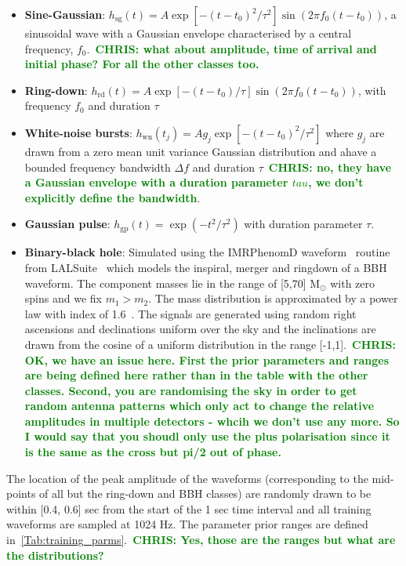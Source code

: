 \documentclass[12pt]{iopart}
\newcommand{\chris}[1]{\textbf{\textcolor{green}{CHRIS: #1}}}
\begin{document}
%
\begin{itemize}
%
\item {\bf Sine-Gaussian}: $h_{\text{sg}}(t) = A \exp\left[ - (t-t_{0})^2 /
\tau^2 \right] \sin (2 \pi f_0 (t-t_0))$, a sinusoidal wave with a Gaussian
envelope characterised by a central frequency, $f_0$.~\chris{what about
amplitude, time of arrival and initial phase? For all the other classes too.}
%
\item {\bf Ring-down}: $h_{\text{rd}}(t) = A \exp \left[-{(t-t_0)} / {\tau}
\right] \sin(2 \pi f_0 (t-t_0))$, with frequency $f_0$ and duration $\tau$
%
\item {\bf White-noise bursts}: $h_{\text{wn}}(t_j) = Ag_j\exp\left[ -
(t-t_{0})^2 / \tau^2 \right]$ where $g_j$ are drawn from a zero mean unit
variance Gaussian distribution and ahave a bounded frequency bandwidth $\Delta
f$ and duration $\tau$~\chris{no, they have a Gaussian envelope with a duration
parameter $tau$, we don't explicitly define the bandwidth}.
%
\item {\bf Gaussian pulse}: $h_{\text{gp}}(t) = \exp(-t^2 / \tau^2)$ with
duration parameter $\tau$.
%
\item {\bf Binary-black hole}: Simulated using the IMRPhenomD
waveform~\cite{Khan_2016} routine from LALSuite~\cite{lalsuite} which models
the inspiral, merger and ringdown of a \ac{BBH} waveform. The component masses
lie in the range of [5,70] $\textrm{M}_{\odot}$ with zero spins and we fix
$m_1>m_2$. The mass distribution is approximated by a power law with
index of 1.6~\cite{Abbott_2019}. The signals are generated using random right
ascensions and declinations uniform over the sky and the inclinations are drawn
from the cosine of a uniform distribution in the range [-1,1].~\chris{OK, we
have an issue here. First the prior parameters and ranges are being defined
here rather than in the table with the other classes. Second, you are
randomising the sky in order to get random antenna patterns which only act to
change the relative amplitudes in multiple detectors - whcih we don't use any
more. So I would say that you shoudl only use the plus polarisation since it is
the same as the cross but pi/2 out of phase.}  
%
\end{itemize}
%
The location of the peak amplitude of the waveforms (corresponding to the
mid-points of all but the ring-down and \ac{BBH} classes) are randomly drawn to
be within [0.4, 0.6] sec from the start of the 1 sec time interval and all
training waveforms are sampled at 1024 Hz.  The parameter prior ranges are
defined in~\cref{Tab:training_parms}.~\chris{Yes, those are the ranges but what
are the distributions?}
\end{document}
